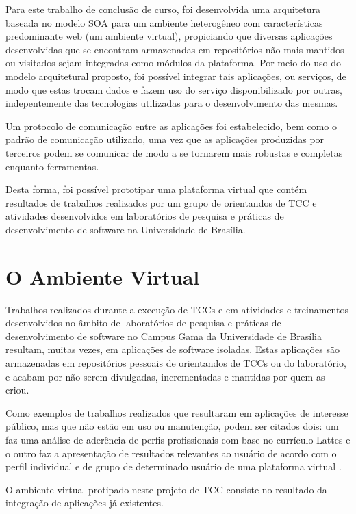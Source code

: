Para este trabalho de conclusão de curso, foi desenvolvida uma arquitetura baseada no modelo SOA para um ambiente heterogêneo com características predominante web (um ambiente virtual), propiciando que diversas aplicações desenvolvidas que se encontram armazenadas em repositórios não mais mantidos ou visitados sejam integradas como módulos da plataforma. Por meio do uso do modelo arquitetural proposto, foi possível integrar tais aplicações, ou serviços, de modo que estas trocam dados e fazem uso do serviço disponibilizado por outras, indepentemente das tecnologias utilizadas para o desenvolvimento das mesmas.

Um protocolo de comunicação entre as aplicações foi estabelecido, bem como o padrão de comunicação utilizado, uma vez que as aplicações produzidas por terceiros podem se comunicar de modo a se tornarem mais robustas e completas enquanto ferramentas.

Desta forma, foi possível prototipar uma plataforma virtual que contém resultados de trabalhos realizados por um grupo de orientandos de TCC e atividades desenvolvidos em laboratórios de pesquisa e práticas de desenvolvimento de software na Universidade de Brasília.

\section{O Ambiente Virtual}

Trabalhos realizados durante a execução de TCCs e em atividades e treinamentos desenvolvidos no âmbito de laboratórios de pesquisa e práticas de desenvolvimento de software no Campus Gama da Universidade de Brasília resultam, muitas vezes, em aplicações de software isoladas. Estas aplicações são armazenadas em repositórios pessoais de orientandos de TCCs ou do laboratório, e acabam por não serem divulgadas, incrementadas e mantidas por quem as criou.

Como exemplos de trabalhos realizados que resultaram em aplicações de interesse público, mas que não estão em uso ou manutenção, podem ser citados dois: um faz uma análise de aderência de perfis profissionais com base no currículo Lattes \cite{jesus_algoritmo_2014} e o outro faz a apresentação de resultados relevantes ao usuário de acordo com o perfil individual e de grupo de determinado usuário de uma plataforma virtual \cite{carvalho_sistema_2014}.

O ambiente virtual protipado neste projeto de TCC consiste no resultado da integração de aplicações já existentes.

